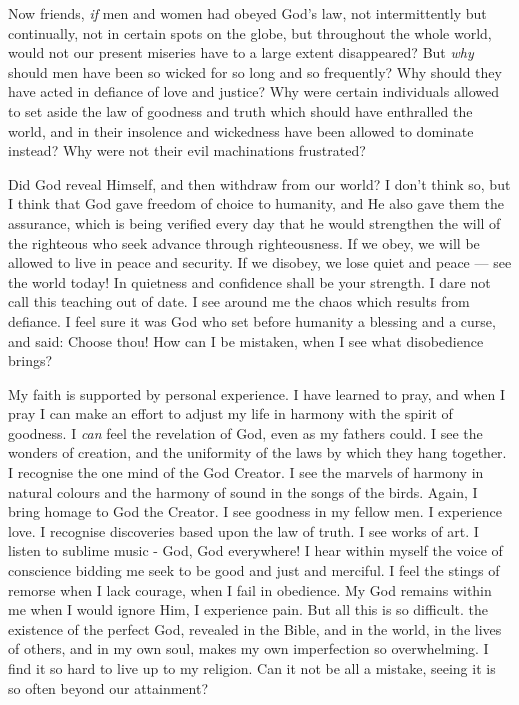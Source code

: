 Now friends, \textsl{if} men and women had obeyed God's law,
not intermittently but continually, not in certain spots on
the globe, but throughout the whole world, would not our
present miseries have to a large extent disappeared? But
\textsl{why} should men have been so wicked for so long and so
frequently? Why should they have acted in defiance of love
and justice? Why were certain individuals allowed to set
aside the law of goodness and truth which should have
enthralled the world, and in their insolence and wickedness
have been allowed to dominate instead? Why were not their
evil machinations frustrated?

Did God reveal Himself, and then withdraw from our
world? I don't think so, but I think that God gave freedom
of choice to humanity, and He also gave them the assurance,
which is being verified every day that he would strengthen
the will of the righteous who seek advance through
righteousness. If we obey, we will be allowed to live in
peace and security. If we disobey, we lose quiet and peace
— see the world today! In quietness and confidence shall
be your strength. I dare not call this teaching out of
date. I see around me the chaos which results from
defiance. I feel sure it was God who set before humanity a
blessing and a curse, and said: Choose thou! How can I be
mistaken, when I see what disobedience brings?

My faith is supported by personal experience. I have
learned to pray, and when I pray I can make an effort to
adjust my life in harmony with the spirit of goodness. I
\textsl{can} feel the revelation of God, even as my fathers could.
I see the wonders of creation, and the uniformity of the
laws by which they hang together. I recognise the one mind
of the God Creator. I see the marvels of harmony in
natural colours and the harmony of sound in the songs of
the birds. Again, I bring homage to God the Creator. I
see goodness in my fellow men. I experience love. I
recognise discoveries based upon the law of truth. I see
works of art. I listen to sublime music - God, God everywhere!
I hear within myself the voice of conscience
bidding me seek to be good and just and merciful. I feel
the stings of remorse when I lack courage, when I fail in
obedience. My God remains within me when I would ignore
Him, I experience pain. But all this is so difficult.
the existence of the perfect God, revealed in the Bible,
and in the world, in the lives of others, and in my own
soul, makes my own imperfection so overwhelming. I find it
so hard to live up to my religion. Can it not be all a
mistake, seeing it is so often beyond our attainment?

